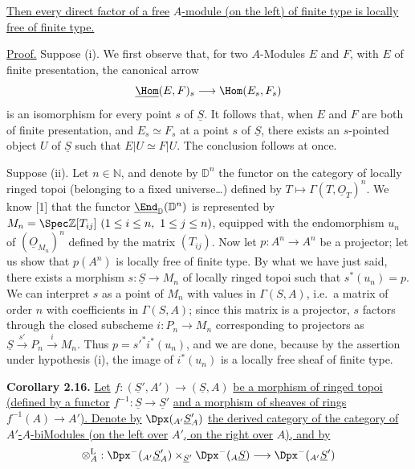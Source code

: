 \uline{Then every direct factor of a free} \(A\)\uline{-module (on the left) of finite type is locally free of finite type.}

\uline{Proof.} Suppose (i). We first observe that, for two \(A\)-Modules \(E\) and \(F\), with \(E\) of finite presentation, the canonical arrow
%
\[
  \underline{\Hom}(E,F)_s\longrightarrow\Hom(E_s,F_s)
\]
is an isomorphism for every point \(s\) of \(\underline{S}\). It follows that, when \(E\) and \(F\) are both of finite presentation, and \(E_s\simeq F_s\) at a point \(s\) of \(\underline{S}\), there exists an \(s\)-pointed object \(U\) of \(\underline{S}\) such that \(E|U\simeq F|U\). The conclusion follows at once.

Suppose (ii). Let \(n\in\mathbb N\), and denote by \(\mathbb D^n\) the functor on the category of locally ringed topoi (belonging to a fixed universe\dots) defined by \(T\longmapsto\Gamma(T,\underline{O}_T)^n\). We know [1] that the functor \(\underline{\End}_{\mathbb D}(\mathbb D^n)\) is represented by \(M_n=\Spec\mathbb Z[T_{ij}]\ (1\leq i\leq n,\ 1\leq j\leq n)\), equipped with the endomorphism \(u_n\) of \((\underline{O}_{M_n})^n\) defined by the matrix \((T_{ij})\). Now let \(p:A^n\longrightarrow A^n\) be a projector; let us show that \(p(A^n)\) is locally free of finite type. By what we have just said, there exists a morphism \(s:\underline{S}\longrightarrow M_n\) of locally ringed topoi such that \(s^*(u_n)=p\). We can interpret \(s\) as a point of \(M_n\) with values in \(\Gamma(S,A)\), i.e.\ a matrix of order \(n\) with coefficients in \(\Gamma(S,A)\); since this matrix is a projector, \(s\) factors through the closed subscheme \(i:P_n\to M_n\) corresponding to projectors as \(\underline{S}\xrightarrow{s'}P_n\xrightarrow{i}M_n\). Thus \(p=s'^*i^*(u_n)\), and we are done, because by the assertion under hypothesis (i), the image of \(i^*(u_n)\) is a locally free sheaf of finite type.

\textbf{Corollary 2.16.} \uline{Let} \(f:(\underline{S}',A')\to(\underline{S},A)\) \uline{be a morphism of ringed topoi (defined by a functor} \(f^{-1}:\underline{S}\to \underline{S}'\) \uline{and a morphism of sheaves of rings} \(f^{-1}(A)\to A'\)\uline{). Denote by} \(\Dpx({}_{A'}\underline{S}'_A)\) \uline{the derived category of the category of} \(A'\)\uline{-}\(A\)\uline{-biModules (on the left over} \(A'\)\uline{, on the right over} \(A\)\uline{), and by}
\[
  \otimes_A^{\mathrm L}:\Dpx^-(_{A'}\underline{S}'_A)\times_{\underline{S}'}\Dpx^-(_A \underline{S})
  \longrightarrow \Dpx^-(_{A'}\underline{S}')
\]
